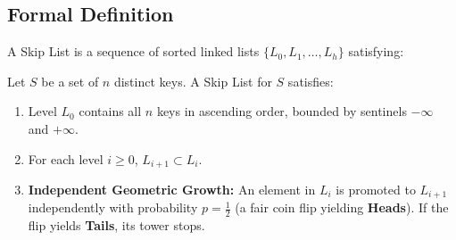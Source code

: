 \subsection{Formal Definition}
A Skip List is a sequence of sorted linked lists $\{L_0, L_1, \dots, L_h\}$ satisfying:
\begin{definition}
Let $S$ be a set of $n$ distinct keys. A Skip List for $S$ satisfies:
\begin{enumerate}
  \item Level $L_0$ contains all $n$ keys in ascending order, bounded by sentinels $-\infty$ and $+\infty$.
  \item For each level $i \ge 0$, $L_{i+1} \subset L_i$.
  \item \textbf{Independent Geometric Growth:} An element in $L_i$ is promoted to $L_{i+1}$ independently with probability $p = \frac{1}{2}$ (a fair coin flip yielding \textbf{Heads}). If the flip yields \textbf{Tails}, its tower stops.
\end{enumerate}
\end{definition}

